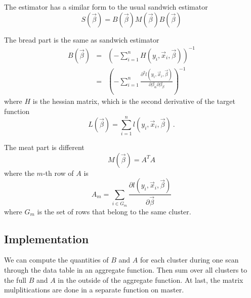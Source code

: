 The estimator has a similar form to the usual sandwich estimator
\begin{equation}
  S(\vec{\beta}) = B(\vec{\beta}) M(\vec{\beta}) B(\vec{\beta})
\end{equation}

The bread part is the same as sandwich estimator
\begin{eqnarray}
  B(\vec{\beta}) & = & \left(-\sum_{i=1}^{n} H(y_i, \vec{x}_i,
    \vec{\beta})\right)^{-1}\\
  & = & \left(-\sum_{i=1}^{n}\frac{\partial^2 l(y_i, \vec{x}_i,
      \vec{\beta})}{\partial \beta_\alpha \partial \beta_\beta}\right)^{-1}
\end{eqnarray}
where $H$ is the hessian matrix, which is the second derivative of the
target function
\begin{equation}
  L(\vec{\beta}) = \sum_{i=1}^n l(y_i, \vec{x}_i, \vec{\beta})\ .
\end{equation}

The meat part is different
\begin{equation}
  M(\vec{\beta}) = {A}^T{A}
\end{equation}
where the $m$-th row of ${A}$ is
\begin{equation}
  A_m = \sum_{i\in G_m}\frac{\partial
      l(y_i,\vec{x}_i,\vec{\beta})}{\partial \vec{\beta}}
\end{equation}
where $G_m$ is the set of rows that belong to the same cluster.

\subsection{Implementation}

We can compute the quantities of $B$ and $A$ for each cluster during one scan
through the data table in an aggregate function. Then sum over all clusters to
the full $B$ and $A$ in the outside of the aggregate function. At last, the
matrix mulplitications are done in a separate function on master.
